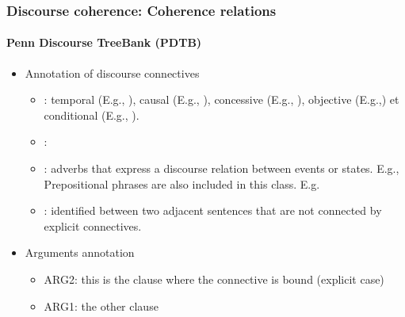 \documentclass[xcolor=table]{beamer}
\begin{document}
\begin{frame}
	\frametitle{Discourse coherence: Coherence relations}
	\framesubtitle{Penn Discourse TreeBank (PDTB)}
	
	\begin{itemize}
		\item Annotation of discourse connectives
		\begin{itemize}
			\item {}:  
			temporal (E.g., ), 
			causal (E.g., ), 
			concessive (E.g., ), 
			objective (E.g.,) et 
			conditional (E.g., ).
			
			\item {}: 
			
			\item {}: adverbs that express a discourse relation between events or states. E.g., 
			Prepositional phrases are also included in this class. E.g. 
			
			\item {}: identified between two adjacent sentences that are not connected by explicit connectives.
		\end{itemize}
		\item Arguments annotation
		\begin{itemize}
			\item ARG2: this is the clause where the connective is bound (explicit case)
			\item ARG1: the other clause
		\end{itemize}
	\end{itemize}
	
\end{frame}
\end{document}
